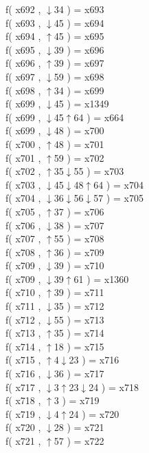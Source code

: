 f( x692 , $\downarrow$34 ) = x693 \\
f( x693 , $\downarrow$45 ) = x694 \\
f( x694 , $\uparrow$45 ) = x695 \\
f( x695 , $\downarrow$39 ) = x696 \\
f( x696 , $\uparrow$39 ) = x697 \\
f( x697 , $\downarrow$59 ) = x698 \\
f( x698 , $\uparrow$34 ) = x699 \\
f( x699 , $\downarrow$45 ) = x1349 \\
f( x699 , $\downarrow$45$\uparrow$64 ) = x664 \\
f( x699 , $\downarrow$48 ) = x700 \\
f( x700 , $\uparrow$48 ) = x701 \\
f( x701 , $\uparrow$59 ) = x702 \\
f( x702 , $\uparrow$35$\downarrow$55 ) = x703 \\
f( x703 , $\downarrow$45$\downarrow$48$\uparrow$64 ) = x704 \\
f( x704 , $\downarrow$36$\downarrow$56$\downarrow$57 ) = x705 \\
f( x705 , $\uparrow$37 ) = x706 \\
f( x706 , $\downarrow$38 ) = x707 \\
f( x707 , $\uparrow$55 ) = x708 \\
f( x708 , $\uparrow$36 ) = x709 \\
f( x709 , $\downarrow$39 ) = x710 \\
f( x709 , $\downarrow$39$\uparrow$61 ) = x1360 \\
f( x710 , $\uparrow$39 ) = x711 \\
f( x711 , $\downarrow$35 ) = x712 \\
f( x712 , $\downarrow$55 ) = x713 \\
f( x713 , $\uparrow$35 ) = x714 \\
f( x714 , $\uparrow$18 ) = x715 \\
f( x715 , $\uparrow$4$\downarrow$23 ) = x716 \\
f( x716 , $\downarrow$36 ) = x717 \\
f( x717 , $\downarrow$3$\uparrow$23$\downarrow$24 ) = x718 \\
f( x718 , $\uparrow$3 ) = x719 \\
f( x719 , $\downarrow$4$\uparrow$24 ) = x720 \\
f( x720 , $\downarrow$28 ) = x721 \\
f( x721 , $\uparrow$57 ) = x722 \\
